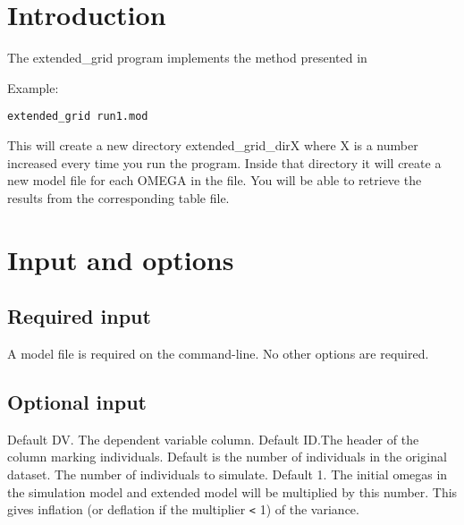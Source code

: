 




\maketitle
\newcommand{\guidetoolname}{extended\_grid}


\section{Introduction}
The extended\_grid program implements the method presented in \cite{Savic}

Example:
\begin{verbatim}
extended_grid run1.mod
\end{verbatim}

This will create a new directory extended\_grid\_dirX where X is a number increased every time you run the program. Inside that
directory it will create a new model file for each OMEGA in the file. You will be able to retrieve the results from the
corresponding table file.

\section{Input and options}

\subsection{Required input}
A model file is required on the command-line. No other options are required.
	
\subsection{Optional input}	
\begin{optionlist}
Default DV. The dependent variable column.  
\nextopt
{}
Default ID.The header of the column marking individuals.  
\nextopt
{}
Default is the number of individuals in the original dataset. The number of individuals to simulate.  
\nextopt
{}
Default 1. The initial omegas in the simulation model and extended model will be multiplied by this number. 
This gives inflation (or deflation if the multiplier \verb|<| 1) of the variance. 
\nextopt
\end{optionlist}


